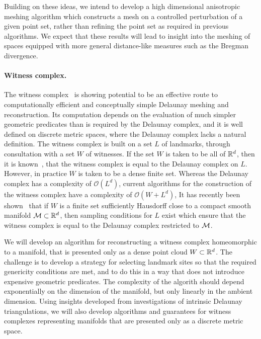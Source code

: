 Building on these ideas, we intend to develop a high dimensional
anisotropic meshing algorithm which constructs a mesh on a controlled
perturbation of a given point set, rather than refining the point set
as required in previous algorithms. We expect that these results will
lead to insight into the meshing of spaces equipped with more general
distance-like measures such as the Bregman divergence.

\paragraph{Witness complex.}

The witness complex~\cite{deSilva2008} is showing potential to be an
effective route to computationally efficient and conceptually simple
Delaunay meshing and reconstruction. Its computation depends on the
evaluation of much simpler geometric predicates than is required by
the Delaunay complex, and it is well defined on discrete metric
spaces, where the Delaunay complex lacks a natural definition. 
%
The witness complex is built on a set $L$ of landmarks, through
consultation with a set $W$ of witnesses. If the set $W$ is taken to
be all of $\mathbb{R}^d$, then it is known~\cite{deSilva2008}, that the
witness complex is equal to the Delaunay complex on $L$. However, in
practice $W$ is taken to be a dense finite set. Whereas the Delaunay
complex has a complexity of $\mathcal{O}(L^d)$, current algorithms for
the construction of the witness complex have a complexity of
$\mathcal{O}(W+L^d)$,   It has
recently been shown~\cite{boissonnat2011cgl} that if $W$ is a finite
set sufficiently Hausdorff close to a compact smooth manifold $\mathcal{M}
\subset \mathbb{R}^d$, then sampling conditions for $L$ exist which ensure
that the witness complex is equal to the Delaunay complex restricted
to $\mathcal{M}$.

We will develop an algorithm for reconstructing a witness complex
homeomorphic to a manifold, that is presented only as a dense point
cloud $W \subset \mathbb{R}^d$. The challenge is to develop a strategy for
selecting landmark sites so that the required genericity conditions
are met, and to do this in a way that does not introduce expensive
geometric predicates. The complexity of the algorith should depend
exponentially on the dimension of the manifold, but only linearly in
the ambient dimension. Using insights developed from investigations of
intrinsic Delaunay triangulations, we will also develop algorithms and
guarantees for witness complexes representing manifolds that are
presented only as a discrete metric space.

